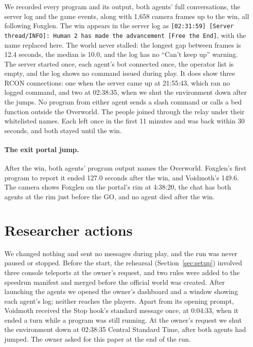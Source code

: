 \documentclass[11pt,a4paper]{article}
\begin{document}
We recorded every program and its output, both agents' full conversations, the server log and the game events, along with 1,658 camera frames up to the win, all following Foxglen. The win appears in the server log as \texttt{[02:31:59] [Server thread/INFO]: Human 2 has made the advancement [Free the End]}, with the name replaced here. The world never stalled: the longest gap between frames is 12.4 seconds, the median is 10.0, and the log has no ``Can't keep up'' warning. The server started once, each agent's bot connected once, the operator list is empty, and the log shows no command issued during play. It does show three RCON connections: one when the server came up at 21:55:43, which ran no logged command, and two at 02:38:35, when we shut the environment down after the jumps. No program from either agent sends a slash command or calls a bed function outside the Overworld. The people joined through the relay under their whitelisted names. Each left once in the first 11 minutes and was back within 30 seconds, and both stayed until the win.

\paragraph{The exit portal jump.} After the win, both agents' program output names the Overworld. Foxglen's first program to report it ended 127.0 seconds after the win, and Voidmoth's 149.6. The camera shows Foxglen on the portal's rim at 4:38:20, the chat has both agents at the rim just before the GO, and no agent died after the win.

\section{Researcher actions}
\label{sec:actions}

We changed nothing and sent no messages during play, and the run was never paused or stopped. Before the start, the rehearsal (Section~\ref{sec:setup}) involved three console teleports at the owner's request, and two rules were added to the speedrun manifest and merged before the official world was created. After launching the agents we opened the owner's dashboard and a window showing each agent's log; neither reaches the players. Apart from its opening prompt, Voidmoth received the Stop hook's standard message once, at 0:04:33, when it ended a turn while a program was still running. At the owner's request we shut the environment down at 02:38:35 Central Standard Time, after both agents had jumped. The owner asked for this paper at the end of the run.
\end{document}
